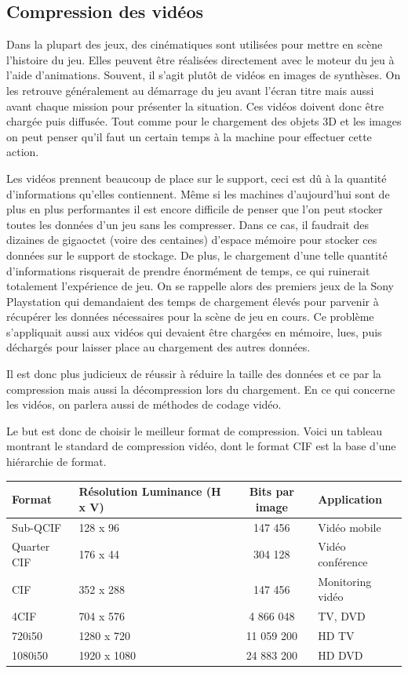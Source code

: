 \documentclass[a4paper, 11pt]{article} %
\begin{document}
\subsection{Compression des vidéos}
Dans la plupart des jeux, des cinématiques sont utilisées pour mettre en scène l'histoire du jeu. Elles peuvent être réalisées directement avec le moteur du jeu à l'aide d'animations. Souvent, il s'agit plutôt de vidéos en images de synthèses. On les retrouve généralement au démarrage du jeu avant l'écran titre mais aussi avant chaque mission pour présenter la situation. Ces vidéos doivent donc être chargée puis diffusée. Tout comme pour le chargement des objets 3D et les images on peut penser qu'il faut un certain temps à la machine pour effectuer cette action. 

Les vidéos prennent beaucoup de place sur le support, ceci est dû à la quantité d'informations qu'elles contiennent. Même si les machines d'aujourd'hui sont de plus en plus performantes il est encore difficile de penser que l'on peut stocker toutes les données d'un jeu sans les compresser. Dans ce cas, il faudrait des dizaines de gigaoctet (voire des centaines) d'espace mémoire pour stocker ces données sur le support de stockage. De plus, le chargement d'une telle quantité d'informations risquerait de prendre énormément de temps, ce qui ruinerait totalement l'expérience de jeu. On se rappelle alors des premiers jeux de la Sony Playstation qui demandaient des temps de chargement élevés pour parvenir à récupérer les données nécessaires pour la scène de jeu en cours. Ce problème s'appliquait aussi aux vidéos qui devaient être chargées en mémoire, lues, puis déchargés pour laisser place au chargement des autres données.

Il est donc plus judicieux de réussir à réduire la taille des données et ce par la compression mais aussi la décompression lors du chargement. En ce qui concerne les vidéos, on parlera aussi de méthodes de codage vidéo.

Le but est donc de choisir le meilleur format de compression. Voici un tableau montrant le standard de compression vidéo, dont le format CIF est la base d'une hiérarchie de format.

\begin{center}
	\begin{tabular}{|l|p{}|c|l|}
		\hline
		Format & Résolution Luminance (H x V) & Bits par image & Application\\
		\hline
		Sub-QCIF&128 x 96&147 456&Vidéo mobile\\
		Quarter CIF&176 x 44&304 128&Vidéo conférence\\
		CIF&352 x 288&147 456&Monitoring vidéo\\
		4CIF&704 x 576&4 866 048&TV, DVD\\
		720i50&1280 x 720&11 059 200&HD TV\\
		1080i50&1920 x 1080&24 883 200&HD DVD\\
		\hline
	\end{tabular}
\end{center}
\end{document}
